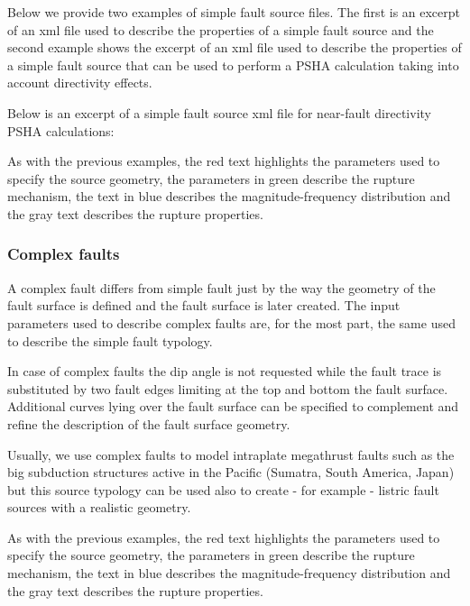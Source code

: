 Below we provide two examples of simple fault source files. The first is an
excerpt of an xml file used to describe the properties of a simple fault
source and the second example shows the excerpt of an xml file used to
describe the properties of a simple fault source that can be used to perform a
PSHA calculation taking into account directivity effects.


\label{example_incremental_mfd}

Below is an excerpt of a simple fault source xml file for near-fault
directivity PSHA calculations:



As with the previous examples, the red text highlights the parameters used to
specify the source geometry, the parameters in green describe the rupture
mechanism, the text in blue describes the magnitude-frequency distribution and
the gray text describes the rupture properties.



\subsubsection{Complex faults}

A complex fault differs from simple fault just by the way the geometry of the
fault surface is defined and the fault surface is later created. The input
parameters used to describe complex faults are, for the most part, the same
used to describe the simple fault typology.

In case of complex faults the dip angle is not requested while the fault trace
is substituted by two fault edges limiting at the top and bottom the fault
surface. Additional curves lying over the fault surface can be specified to
complement and refine the description of the fault surface geometry.

Usually, we use complex faults to model intraplate megathrust faults such as
the big subduction structures active in the Pacific (Sumatra, South America,
Japan) but this source typology can be used also to create - for example -
listric fault sources with a realistic geometry.



As with the previous examples, the red text highlights the parameters used to
specify the source geometry, the parameters in green describe the rupture
mechanism, the text in blue describes the magnitude-frequency distribution and
the gray text describes the rupture properties.
